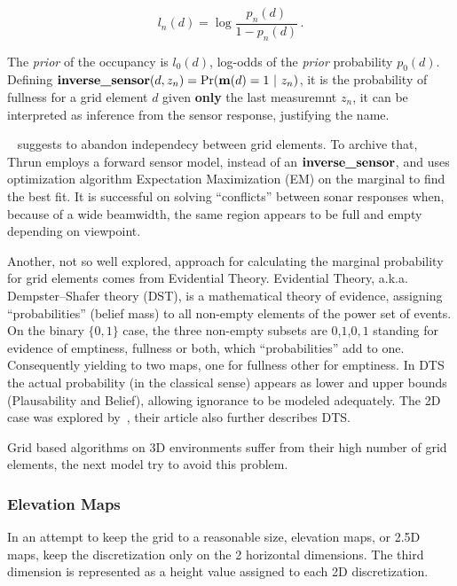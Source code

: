 \begin{equation*}
l_n(d) = \log\frac{p_n(d)}{1-p_n(d)}\,.
\end{equation*}

The \textit{prior} of the occupancy is $l_0(d)$, log-odds of the \textit{prior}
probability $p_0(d)$. Defining
$\text{\textbf{inverse\_sensor}}(d,z_n)=\Pr(\mathrm{\mathbf{m}}(d)=1~|~z_n)$, it is the
probability of fullness for a grid element $d$ given \textbf{only} the last
measuremnt $z_n$, it can be interpreted as inference from the sensor response,
justifying the name.

~\citet{thrunprob} suggests to abandon independecy between grid elements. To
archive that, Thrun employs a forward sensor model, instead of an
$\text{\textbf{inverse\_sensor}}$, and uses optimization algorithm Expectation
Maximization (EM) on the marginal to find the best fit. It is
successful on solving ``conflicts'' between sonar responses when, because of a wide beamwidth,
the same region appears to be full and empty depending on viewpoint.

Another, not so well explored, approach for calculating the marginal probability
for grid elements comes from Evidential Theory. Evidential Theory, a.k.a.
Dempster–Shafer theory (DST), is a
mathematical theory of evidence, assigning ``probabilities'' (belief mass) to all non-empty elements of the power set of
events. On the binary $\{0,1\}$ case, the three non-empty subsets are
${0}$,${1}$,${0,1}$ standing for evidence of emptiness, fullness or both, which
``probabilities'' add to one.
Consequently yielding to two maps, one for fullness other for emptiness. In DTS
the actual probability (in the classical sense) appears as lower and upper
bounds (Plausability and Belief), allowing ignorance to be modeled adequately.
The 2D case was explored by~\citet{Pagac1998}, their article also further
describes DTS.

Grid based algorithms on 3D environments suffer from their high number of grid
elements, the next model try to avoid this problem.

\subsubsection{Elevation Maps}

In an attempt to keep the grid to a reasonable size, elevation maps, or 2.5D
maps, keep the discretization only on the 2 horizontal dimensions. The third
dimension is represented as a height value assigned to each 2D discretization.

